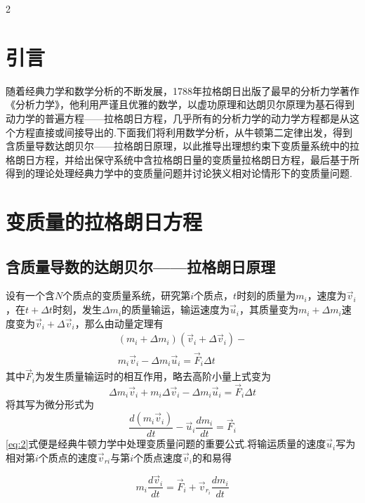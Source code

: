 \documentclass[12pt,twoside]{article}
\numberwithin{equation}{section}    %
\begin{document}
\begin{multicols}{2}                %

    \section{引言}
    随着经典力学和数学分析的不断发展，1788年拉格朗日出版了最早的分析力学著作《分析力学》，他利用严谨且优雅的数学，以虚功原理和达朗贝尔原理为基石得到动力学的普遍方程——拉格朗日方程，几乎所有的分析力学的动力学方程都是从这个方程直接或间接导出的.\cite{zhou2001}下面我们将利用数学分析，从牛顿第二定律出发，得到含质量导数达朗贝尔——拉格朗日原理，以此推导出理想约束下变质量系统中的拉格朗日方程，并给出保守系统中含拉格朗日量的变质量拉格朗日方程，最后基于所得到的理论处理经典力学中的变质量问题并讨论狭义相对论情形下的变质量问题\cite{yang1989}.

    \section{变质量的拉格朗日方程}
    \subsection{含质量导数的达朗贝尔——拉格朗日原理}
    设有一个含$N$个质点的变质量系统，研究第$i$个质点，$t$时刻的质量为$m_i$，速度为$\vec{v}_i$，在$t+\Delta t$时刻，发生$\Delta m_i$的质量输运，输运速度为$\vec{u}_i$，其质量变为$m_i+\Delta m_i$速度变为$\vec{v}_i+\Delta \vec{v}_i$，那么由动量定理有
    \begin{equation}
        \begin{split}
            (m_i+\Delta m_i)(\vec{v}_i+\Delta\vec{v}_i) - \\ m_i\vec{v}_i - \Delta m_i\vec{u}_i = \vec{F}_i\Delta t
        \end{split}
        \label{eq:1}
    \end{equation}
    其中$\vec{F}_i$为发生质量输运时的相互作用，略去高阶小量上式变为
    \[
    \Delta m_i\vec{v}_i+m_i\Delta \vec{v}_i-\Delta m_i\vec{u}_i=\vec{F}_i\Delta t
    \]
    将其写为微分形式为
    \begin{equation}
        \frac{d\left( m_i\vec{v}_i \right)}{dt}-\vec{u}_i\frac{dm_i}{dt}=\vec{F}_i
        \label{eq:2}
    \end{equation}
    \eqref{eq:2}式便是经典牛顿力学中处理变质量问题的重要公式.将输运质量的速度$\vec{u}_i$写为相对第$i$个质点的速度$\vec{v}_{ri}$与第$i$个质点速度$\vec{v}_i$的和易得

    \begin{equation}
        m_i\frac{d\vec{v}_i}{dt} = \vec{F}_i + \vec{v}_{r_i} \frac{dm_i}{dt}
        \label{eq:3}
    \end{equation}


\end{multicols}
\end{document}
